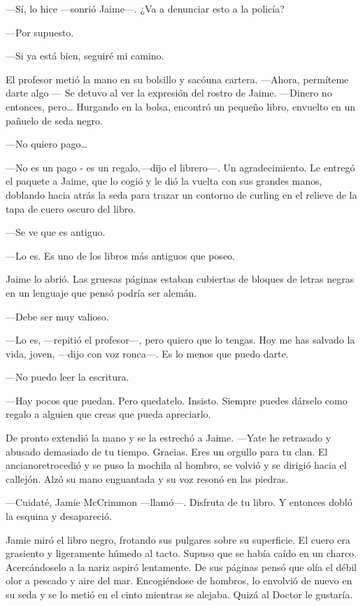 ---Sí, lo hice ---sonrió Jaime---. ¿Va a denunciar esto a la
policía?

---Por supuesto.

---Si ya está bien, seguiré mi camino.

El profesor metió la mano en su bolsillo y sacóuna cartera.
---Ahora, permíteme darte algo --- Se detuvo al ver la expresión del
rostro de Jaime. ---Dinero no entonces, pero\ldots{} Hurgando en la
bolsa, encontró un pequeño libro, envuelto en un pañuelo de seda negro.

---No quiero pago\ldots{}

---No es un pago - es un regalo,---dijo el librero---. Un
agradecimiento. Le entregó el paquete a Jaime, que lo cogió y le dió la
vuelta con sus grandes manos, doblando hacia atrás la seda para trazar
un contorno de curling en el relieve de la tapa de cuero oscuro del
libro.

---Se ve que es antiguo.

---Lo es. Es uno de los libros más antiguos que poseo.

Jaime lo abrió. Las gruesas páginas estaban cubiertas de bloques
de letras negras en un lenguaje que pensó podría ser alemán.

---Debe ser muy valioso.

---Lo es, ---repitió el profesor---, pero quiero que lo tengas.
Hoy me has salvado la vida, joven, ---dijo con voz ronca---. Es lo menos
que puedo darte.

---No puedo leer la escritura.

---Hay pocos que puedan. Pero quedatelo. Insisto. Siempre puedes
dárselo como regalo a alguien que creas que pueda apreciarlo.

De pronto extendió la mano y se la estrechó a Jaime. ---Yate he
retrasado y abusado demasiado de tu tiempo. Gracias. Eres un orgullo
para tu clan. El ancianoretrocedió y se puso la mochila al hombro, se
volvió y se dirigió hacia el callejón. Alzó su mano enguantada y su voz
resonó en las piedras.

---Cuidaté, Jamie McCrimmon ---llamó---. Disfruta de tu libro. Y
entonces dobló la esquina y desapareció.

Jamie miró el libro negro, frotando sus pulgares sobre su
superficie. El cuero era grasiento y ligeramente húmedo al tacto. Supuso
que se había caído en un charco. Acercándoselo a la nariz aspiró
lentamente. De sus páginas pensó que olía el débil olor a pescado y aire
del mar. Encogiéndose de hombros, lo envolvió de nuevo en su seda y se
lo metió en el cinto mientras se alejaba. Quizá al Doctor le gustaría.

